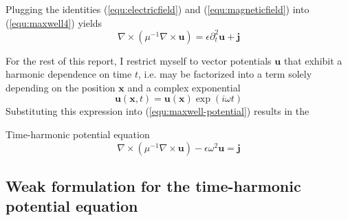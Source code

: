 \documentclass[11pt, a4paper]{article}
\begin{document}
Plugging the identities (\ref{equ:electricfield}) and (\ref{equ:magneticfield})
into (\ref{equ:maxwell4}) yields 
\begin{equation}
    \nabla \times (\mu^{-1} \nabla \times \mathbf{u}) =  \epsilon \partial_t^2 \mathbf{u} + \mathbf{j} \label{equ:maxwell-potential}
\end{equation}

For the rest of this report, I restrict myself to vector potentials $\mathbf{u}$
that exhibit a harmonic dependence on time $t$, i.e. may be factorized into
a term solely depending on the position $\mathbf{x}$ and a complex exponential
\begin{equation}
    \mathbf{u}(\mathbf{x}, t) = \mathbf{u}(\mathbf{x}) \exp(i \omega t) \label{equ:time-harmonic}
\end{equation}
Substituting this expression into (\ref{equ:maxwell-potential}) results in the
\begin{fancybox}{Time-harmonic potential equation}
    \begin{equation}
     \nabla \times (\mu^{-1} \nabla \times \mathbf{u}) - \epsilon \omega^2 \mathbf{u} = \mathbf{j} \label{equ:maxwell-timeharmonic}
    \end{equation}
\end{fancybox}

\subsection{Weak formulation for the time-harmonic potential equation}
\label{subsec:maxwell-weak}
\end{document}
